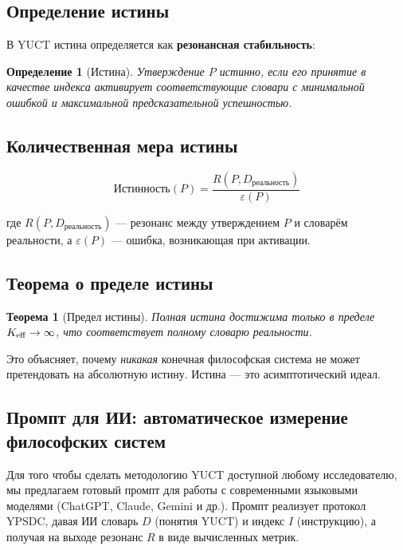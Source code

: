 \documentclass[12pt,a4paper]{article}
\newcommand{\eps}{\varepsilon}
\newtheorem{theorem}{Теорема}[section]
\newtheorem{definition}{Определение}[section]
\begin{document}
	\subsection{Определение истины}
	
	В YUCT истина определяется как \textbf{резонансная стабильность}:
	
	\begin{definition}[Истина]
		Утверждение \(P\) истинно, если его принятие в качестве индекса активирует соответствующие словари с минимальной ошибкой и максимальной предсказательной успешностью.
	\end{definition}
	
	\subsection{Количественная мера истины}
	
	\begin{equation}
		\text{Истинность}(P) = \frac{R(P, D_{\text{реальность}})}{\eps(P)}
	\end{equation}
	
	где \(R(P, D_{\text{реальность}})\) — резонанс между утверждением \(P\) и словарём реальности, а \(\eps(P)\) — ошибка, возникающая при активации.
	
	\subsection{Теорема о пределе истины}
	
	\begin{theorem}[Предел истины]
		Полная истина достижима только в пределе \(\Keff \to \infty\), что соответствует полному словарю реальности.
	\end{theorem}
	
	Это объясняет, почему \emph{никакая} конечная философская система не может претендовать на абсолютную истину. Истина — это асимптотический идеал.
	
	\subsection{Промпт для ИИ: автоматическое измерение философских систем}
	\label{sec:llm-prompt}
	
	Для того чтобы сделать методологию YUCT доступной любому исследователю, мы предлагаем готовый промпт для работы с современными языковыми моделями (ChatGPT, Claude, Gemini и др.). Промпт реализует протокол YPSDC, давая ИИ словарь \(D\) (понятия YUCT) и индекс \(I\) (инструкцию), а получая на выходе резонанс \(R\) в виде вычисленных метрик.
	
\end{document}
